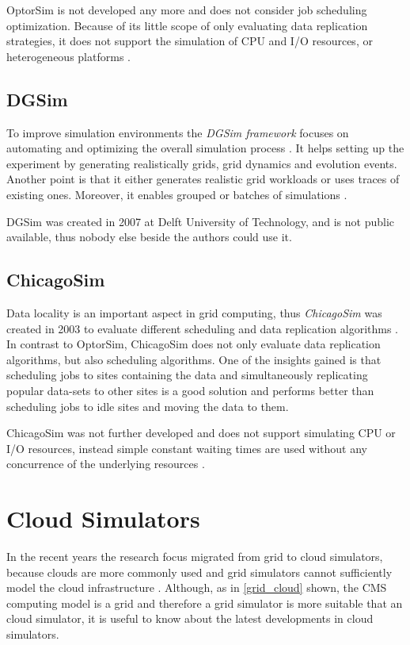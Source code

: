 OptorSim is not developed any more and does not consider job scheduling optimization. Because of its little scope of only evaluating data replication strategies, it does not support the simulation of CPU and I/O resources, or heterogeneous platforms \cite{optorsim}.


\subsection{DGSim}
To improve simulation environments the \textit{DGSim framework} focuses on automating and optimizing the overall simulation process \cite{dgsim}. It helps setting up the experiment by generating realistically grids, grid dynamics and evolution events. Another point is that it either generates realistic grid workloads or uses traces of existing ones. Moreover, it enables grouped or batches of simulations \cite{dgsim}.

DGSim was created in 2007 at Delft University of Technology, and is not public available, thus nobody else beside the authors could use it.


\subsection{ChicagoSim}
Data locality is an important aspect in grid computing, thus \textit{ChicagoSim} was created in 2003 to evaluate different scheduling and data replication algorithms \cite{chicagosim}. In contrast to OptorSim, ChicagoSim does not only evaluate data replication algorithms, but also scheduling algorithms. 
One of the insights gained is that scheduling jobs to sites containing the data and simultaneously replicating popular data-sets to other sites is a good solution and performs better than scheduling jobs to idle sites and moving the data to them.

ChicagoSim was not further developed and does not support simulating CPU or I/O resources, instead simple constant waiting times are used without any concurrence of the underlying resources \cite{chicagosim}. 


\newpage
\section{Cloud Simulators}
In the recent years the research focus migrated from grid to cloud simulators, because clouds are more commonly used and grid simulators cannot sufficiently model the cloud infrastructure \cite{compare_grid_cloud}. Although, as in \cref{grid_cloud} shown, the CMS computing model is a grid and therefore a grid simulator is more suitable that an cloud simulator, it is useful to know about the latest developments in cloud simulators. 

